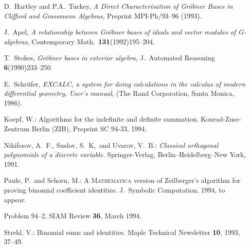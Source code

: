 \begin{thebibliography}{999}


	D.~Hartley and P.A.~Tuckey, {\em
	A Direct Characterisation of Gr{\"o}bner Bases in Clifford and
	Grassmann Algebras,}
	Preprint MPI-Ph/93--96 (1993).

	J.~Apel, {\em A relationship between Gr{\"o}bner bases of ideals and
	vector modules of G-algebras,}
	Contemporary Math.~\textbf{131}(1992)195--204.

	T.~Stokes, {\em
	Gr{\"o}bner bases in exterior algebra,}
	J.~Automated Reasoning \textbf{6}(1990)233--250.

	E.~Schr{\"u}fer, {\em
	EXCALC, a system for doing calculations in the calculus of modern
	differential geometry, User's manual,}
	(The Rand Corporation, Santa Monica, 1986).



Koepf, W.:
Algorithms for the indefinite and definite summation.
Konrad-Zuse-Zentrum Berlin (ZIB), Preprint SC 94-33, 1994.


Nikiforov, A.\ F., Suslov, S.\ K,\ and Uvarov, V.\ B.: {\sl Classical
orthogonal polynomials of a discrete variable.} Springer-Verlag,
Berlin--Heidelberg--New York, 1991.

Paule, P.\ and Schorn, M.: A \textsc{Mathematica} version of Zeilberger's
algorithm for proving binomial coefficient identities. J.\ Symbolic
Computation, 1994, to appear.

Problem 94--2, SIAM Review \textbf{36}, March 1994.

Strehl, V.:
Binomial sums and identities. Maple Technical Newsletter \textbf{10}, 1993, 37--49.


\end{thebibliography}
